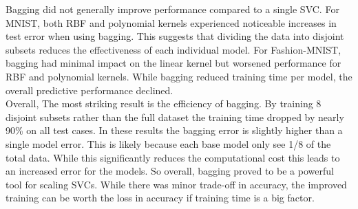 \documentclass{article}
\begin{document}
Bagging did not generally improve performance compared to a single SVC. For MNIST, both RBF and polynomial kernels experienced noticeable increases in test error when using bagging. This suggests that dividing the data into disjoint subsets reduces the effectiveness of each individual model. For Fashion-MNIST, bagging had minimal impact on the linear kernel but worsened performance for RBF and polynomial kernels. While bagging reduced training time per model, the overall predictive performance declined.\\ 
Overall, The most striking result is the efficiency of bagging. By training 8 disjoint subsets rather than the full dataset the training time dropped by nearly 90\% on all test cases. In these results the bagging error is slightly higher than a single model error. This is likely because each base model only see 1/8 of the total data. While this significantly reduces the computational cost this leads to an increased error for the models. So overall, bagging proved to be a powerful tool for scaling SVCs. While there was minor trade-off in accuracy, the improved training can be worth the loss in accuracy if training time is a big factor. 
\end{document}
